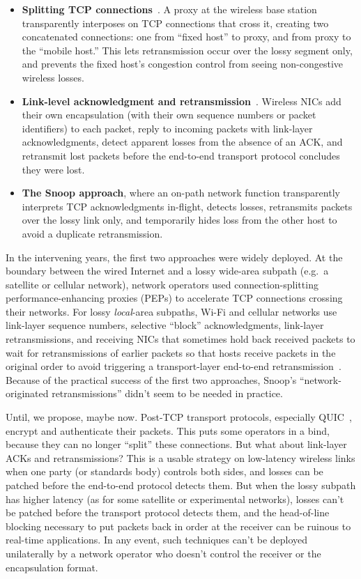 \begin{itemize}[noitemsep]
\item \textbf{Splitting TCP connections}~\cite{bakreitcp1994, bb95}. A
  proxy at the wireless base station transparently interposes on TCP
  connections that cross it, creating two concatenated connections:
  one from ``fixed host'' to proxy, and from proxy to the ``mobile
  host.'' This lets retransmission occur over the lossy segment only,
  and prevents the fixed host's congestion control from seeing
  non-congestive wireless losses.

\item \textbf{Link-level acknowledgment and
  retransmission}~\cite{palplus}. Wireless NICs add their own
  encapsulation (with their own sequence numbers or packet
  identifiers) to each packet, reply to incoming packets with
  link-layer acknowledgments, detect apparent losses from the absence
  of an ACK, and retransmit lost packets before the end-to-end
  transport protocol concludes they were lost.

\item \textbf{The Snoop approach}, where an on-path network function
  transparently interprets TCP acknowledgments in-flight, detects
  losses, retransmits packets over the lossy link only, and
  temporarily hides loss from the other host to avoid a duplicate
  retransmission.
\end{itemize}

In the intervening years, the first two approaches were widely
deployed. At the boundary between the wired Internet and a lossy
wide-area subpath (e.g.~a satellite or cellular network), network
operators used connection-splitting performance-enhancing proxies
(PEPs) to accelerate TCP connections crossing their networks. For
lossy \emph{local}-area subpaths, Wi-Fi and cellular networks use
link-layer sequence numbers, selective ``block'' acknowledgments,
link-layer retransmissions, and receiving NICs that sometimes hold
back received packets to wait for retransmissions of earlier packets
so that hosts receive packets in the original order to avoid
triggering a transport-layer end-to-end retransmission~\cite{rfc3366,
  rfc8985, 802.1ac, 5Greorder}. Because of the practical success of
the first two approaches, Snoop's ``network-originated
retransmissions'' didn't seem to be needed in practice.

Until, we propose, maybe now. Post-TCP transport protocols,
especially QUIC~\cite{rfc9000}, encrypt and authenticate their
packets. This puts some operators in a bind, because they can no longer
``split'' these connections.
But what about link-layer ACKs and retransmissions?
This is a usable strategy on low-latency wireless links when one party
(or standards body) controls both sides, and losses can be patched
before the end-to-end protocol detects them. But when the lossy
subpath has higher latency (as for some satellite or experimental
networks), losses can't be patched before the transport protocol
detects them, and the head-of-line blocking necessary to put
packets back in order at the receiver can be ruinous to real-time
applications. In any event, such techniques can't be deployed
unilaterally by a network operator who doesn't control the receiver or
the encapsulation format.

